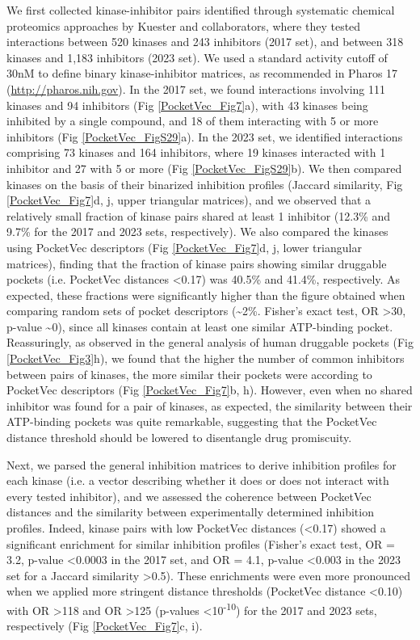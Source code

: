 We first collected kinase-inhibitor pairs identified through systematic chemical proteomics approaches by Kuester and collaborators, where they tested interactions between 520 kinases and 243 inhibitors (2017 set)\cite{klaeger_target_2017}, and between 318 kinases and 1,183 inhibitors (2023 set)\cite{reinecke_chemical_2023}. We used a standard activity cutoff of 30nM to define binary kinase-inhibitor matrices, as recommended in Pharos 17 (\href{http://pharos.nih.gov}{http://pharos.nih.gov}). In the 2017 set, we found interactions involving 111 kinases and 94 inhibitors (Fig \ref{PocketVec_Fig7}a), with 43 kinases being inhibited by a single compound, and 18 of them interacting with 5 or more inhibitors (Fig \ref{PocketVec_FigS29}a). In the 2023 set, we identified interactions comprising 73 kinases and 164 inhibitors, where 19 kinases interacted with 1 inhibitor and 27 with 5 or more (Fig \ref{PocketVec_FigS29}b). We then compared kinases on the basis of their binarized inhibition profiles (Jaccard similarity, Fig \ref{PocketVec_Fig7}d, j, upper triangular matrices), and we observed that a relatively small fraction of kinase pairs shared at least 1 inhibitor (12.3\% and 9.7\% for the 2017 and 2023 sets, respectively). We also compared the kinases using PocketVec descriptors (Fig \ref{PocketVec_Fig7}d, j, lower triangular matrices), finding that the fraction of kinase pairs showing similar druggable pockets (i.e. PocketVec distances <0.17) was 40.5\% and 41.4\%, respectively. As expected, these fractions were significantly higher than the figure obtained when comparing random sets of pocket descriptors (\textasciitilde2\%. Fisher’s exact test, OR >30, p-value \textasciitilde0), since all kinases contain at least one similar ATP-binding pocket. Reassuringly, as observed in the general analysis of human druggable pockets (Fig \ref{PocketVec_Fig3}h), we found that the higher the number of common inhibitors between pairs of kinases, the more similar their pockets were according to PocketVec descriptors (Fig \ref{PocketVec_Fig7}b, h). However, even when no shared inhibitor was found for a pair of kinases, as expected, the similarity between their ATP-binding pockets was quite remarkable, suggesting that the PocketVec distance threshold should be lowered to disentangle drug promiscuity.
  

Next, we parsed the general inhibition matrices to derive inhibition profiles for each kinase (i.e. a vector describing whether it does or does not interact with every tested inhibitor), and we assessed the coherence between PocketVec distances and the similarity between experimentally determined inhibition profiles. Indeed, kinase pairs with low PocketVec distances (<0.17) showed a significant enrichment for similar inhibition profiles (Fisher’s exact test, OR = 3.2, p-value <0.0003 in the 2017 set, and OR = 4.1, p-value <0.003 in the 2023 set for a Jaccard similarity >0.5). These enrichments were even more pronounced when we applied more stringent distance thresholds (PocketVec distance <0.10) with OR >118 and OR >125 (p-values <10\textsuperscript{-10}) for the 2017 and 2023 sets, respectively (Fig \ref{PocketVec_Fig7}c, i).

